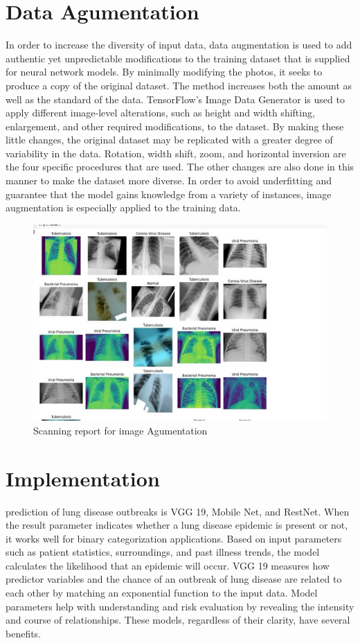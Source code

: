 \section{Data Agumentation}
In order to increase the diversity of input data, data augmentation is used to add authentic yet unpredictable modifications to the training dataset that is supplied for neural network models. By minimally modifying the photos, it seeks to produce a copy of the original dataset. The method increases both the amount as well as the standard of the data. TensorFlow's Image Data Generator is used to apply different image-level alterations, such as height and width shifting, enlargement, and other required modifications, to the dataset. By making these little changes, the original dataset may be replicated with a greater degree of variability in the data. Rotation, width shift, zoom, and horizontal inversion are the four specific procedures that are used. The other changes are also done in this manner to make the dataset more diverse. In order to avoid underfitting and guarantee that the model gains knowledge from a variety of instances, image augmentation is especially applied to the training data.
\begin{figure}[ht]
    \centering
    \includegraphics[scale=0.5]{figures/scan .jpg}
    \caption{Scanning report for image Agumentation}
    \label{fig:chart_a}
\end{figure}
\section {Implementation}
prediction of lung disease outbreaks is VGG 19, Mobile Net, and RestNet. When the result parameter indicates whether a lung disease epidemic is present or not, it works well for binary categorization applications. Based on input parameters such as patient statistics, surroundings, and past illness trends, the model calculates the likelihood that an epidemic will occur. VGG 19 measures how predictor variables and the chance of an outbreak of lung disease are related to each other by matching an exponential function to the input data. Model parameters help with understanding and risk evaluation by revealing the intensity and course of relationships. These models, regardless of their clarity, have several benefits. 

